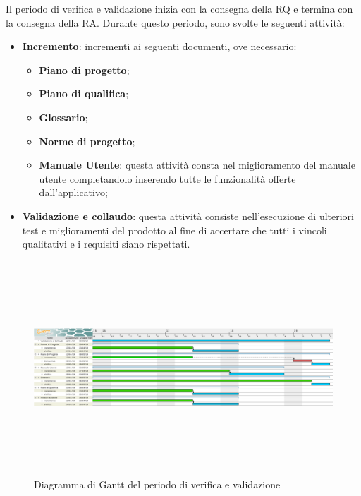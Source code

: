 Il periodo di verifica e validazione inizia con la consegna della RQ e termina con la consegna della RA.\newline
Durante questo periodo, sono svolte le seguenti attività:
\begin{itemize}
	\item \textbf{Incremento}: incrementi ai seguenti documenti, ove necessario:
	\begin{itemize}
		\item \textbf{Piano di progetto};
		\item \textbf{Piano di qualifica};
		\item \textbf{Glossario};
		\item \textbf{Norme di progetto};
		\item \textbf{Manuale Utente}: questa attività consta nel miglioramento del manuale utente completandolo inserendo tutte le funzionalità offerte dall'applicativo;
	\end{itemize}
	\item \textbf{Validazione e collaudo}: questa attività consiste nell’esecuzione di ulteriori test e miglioramenti del prodotto al fine di accertare che tutti i vincoli qualitativi e i requisiti siano rispettati.
\end{itemize}


\begin{figure}[H]
		\hspace*{-1.5cm}
	\includegraphics[width=19.4cm, height=8cm]{Pianificazione/verificaValidazione.pdf}
	\caption{Diagramma di Gantt del periodo di verifica e validazione}
\end{figure}